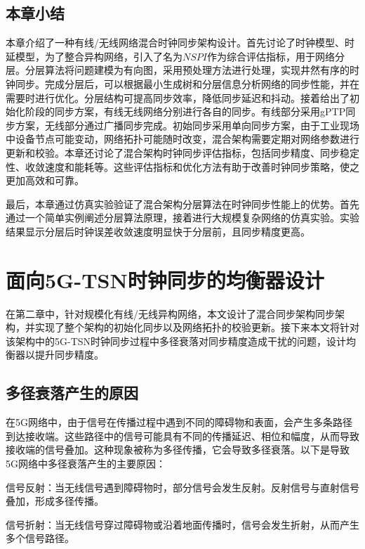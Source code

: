 \documentclass[UTF8,a4paper,12pt]{ctexart}
\numberwithin{equation}{section}
\begin{document}
	\subsection{本章小结}
	本章介绍了一种有线/无线网络混合时钟同步架构设计。首先讨论了时钟模型、时延模型，为了整合异构网络，引入了名为$NSPI$作为综合评估指标，用于网络分层。分层算法将问题建模为有向图，采用预处理方法进行处理，实现井然有序的时钟同步。完成分层后，可以根据最小生成树和分层信息分析网络的同步性能，并在需要时进行优化。分层结构可提高同步效率，降低同步延迟和抖动。接着给出了初始化阶段的同步方案，有线无线网络分别进行各自的同步。有线部分采用gPTP同步方案，无线部分通过广播同步完成。初始同步采用单向同步方案，由于工业现场中设备节点可能变动，网络拓扑可能随时改变，混合架构需要定期对网络参数进行更新和校验。本章还讨论了混合架构时钟同步评估指标，包括同步精度、同步稳定性、收敛速度和能耗等。这些评估指标和优化方法有助于改善时钟同步策略，使之更加高效和可靠。
	
	最后，本章通过仿真实验验证了混合架构分层算法在时钟同步性能上的优势。首先通过一个简单实例阐述分层算法原理，接着进行大规模复杂网络的仿真实验。实验结果显示分层后时钟误差收敛速度明显快于分层前，且同步精度更高。
	
	\newpage
	\section{面向5G-TSN时钟同步的均衡器设计}
	
	在第二章中，针对规模化有线/无线异构网络，本文设计了混合同步架构同步架构，并实现了整个架构的初始化同步以及网络拓扑的校验更新。接下来本文将针对该架构中的5G-TSN时钟同步过程中多径衰落对同步精度造成干扰的问题，设计均衡器以提升同步精度。
	
	\subsection{多径衰落产生的原因}
	
	在5G网络中，由于信号在传播过程中遇到不同的障碍物和表面，会产生多条路径到达接收端。这些路径中的信号可能具有不同的传播延迟、相位和幅度，从而导致接收端的信号叠加。这种现象被称为多径传播，它会导致多径衰落。以下是导致5G网络中多径衰落产生的主要原因：
	
	信号反射：当无线信号遇到障碍物时，部分信号会发生反射。反射信号与直射信号叠加，形成多径传播。
	
	信号折射：当无线信号穿过障碍物或沿着地面传播时，信号会发生折射，从而产生多个信号路径。
	
\end{document}
